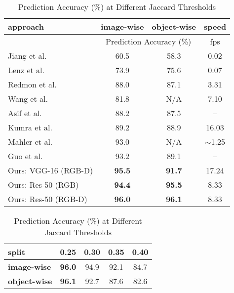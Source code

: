 \documentclass[letterpaper, 10 pt, journal, twoside]{IEEEtran}
\begin{document}
\begin {table}[t]
  \centering
\caption {Single-Object Single-Grasp Evaluation  }
  \small
  \begin{tabular}{ | l | c | c | c |}
    \hline
    {\bf approach} & \bf{image-wise} & \bf{object-wise} & \bf{speed} \\ \hline
                  & \multicolumn{2}{c|}{Prediction Accuracy (\%)} & fps \\ \hline
    
    Jiang et al. \cite{jiang2011efficient}  & 60.5 & 58.3 & 0.02  \\ \hline
    Lenz et al.  \cite{lenz2015deep}        & 73.9 & 75.6 & 0.07    \\ \hline
    Redmon et al. \cite{redmon2015real}     & 88.0 & 87.1 & 3.31  \\ \hline
    Wang et al. \cite{wang2016robot}	    & 81.8 & N/A  & 7.10  \\ \hline
    Asif et al.	\cite{asif2017rgb}          & 88.2 & 87.5 & --    \\ \hline
    Kumra et al.	\cite{kumra2016robotic} & 89.2 & 88.9 & 16.03 \\ \hline
    Mahler et al. \cite{MaEtAl_RSS[2017]}   & 93.0 & N/A  & $\sim$1.25  \\ \hline
    Guo et al. \cite{GuEtAl_ICRA2017}     & 93.2 & 89.1 & --    \\
    \hline \hline 
    Ours: VGG-16	 (RGB-D)                       & \bf{95.5} & \bf{91.7} & 17.24 \\ 
    \hline 
    Ours: Res-50 (RGB)                   & \bf{94.4} & \bf{95.5} & 8.33 \\ 
    \hline 
    Ours: Res-50 (RGB-D)                        & \bf{96.0} & \bf{96.1} & 8.33 \\ 

    \hline
  \end{tabular}
  \vspace*{0.25ex}
  \caption {Prediction Accuracy (\%) at Different Jaccard Thresholds 
  }
  \begin{tabular}{ | l | c | c | c | c| }
    \hline
    \bf{split} & 0.25 & 0.30 & 0.35 & 0.40 \\ \hline
    
    \bf{image-wise}   &  \bf{96.0}  &  94.9  & 92.1  & 84.7 \\ \hline
    \bf{object-wise}  &  \bf{96.1}  &  92.7  & 87.6  & 82.6 \\ 
    \hline
  \end{tabular}
  \vspace*{-0.075in}
\end {table}
\end{document}
